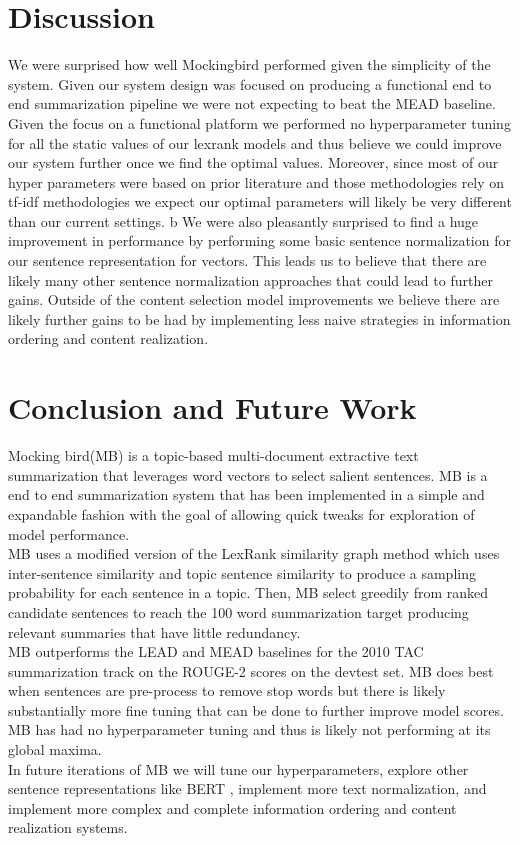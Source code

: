 \documentclass[11pt,a4paper]{article}
\begin{document}
\section{Discussion}
We were surprised how well Mockingbird performed given the simplicity of the system. Given our system design was focused on producing a functional end to end summarization pipeline we were not expecting to beat the MEAD baseline. Given the focus on a functional platform we performed no hyperparameter tuning for all the static values of our lexrank models and thus believe we could improve our system further once we find the optimal values. Moreover, since most of our hyper parameters were based on prior literature and those methodologies rely on tf-idf methodologies we expect our optimal parameters will likely be very different than our current settings.  b We were also pleasantly surprised to find a huge improvement in performance by performing some basic sentence normalization for our sentence representation for vectors. This leads us to believe that there are likely many other sentence normalization approaches that could lead to further gains.  Outside of the content selection model improvements we believe there are likely further gains to be had by implementing less naive strategies in information ordering and content realization. 
\section{Conclusion and Future Work}
Mocking bird(MB) is a topic-based multi-document extractive text summarization that leverages word vectors to select salient sentences. MB is a end to end summarization system that has been implemented in a simple and expandable fashion with the goal of allowing quick tweaks for exploration of model performance. \\
MB uses a modified version of the LexRank similarity graph method which uses inter-sentence similarity and topic sentence similarity to produce a sampling probability for each sentence in a topic. Then, MB select greedily from ranked candidate sentences to reach the 100 word summarization target producing relevant summaries that have little redundancy. \\
MB outperforms the LEAD and MEAD baselines for the 2010 TAC summarization track on the ROUGE-2 scores on the devtest set. MB does best when sentences are pre-process to remove stop words but there is likely substantially more fine tuning that can be done to further improve model scores. MB has had no hyperparameter tuning and thus is likely not performing at its global maxima. \\
In future iterations of MB we will tune our hyperparameters, explore other sentence representations like BERT \cite{Devlin2019BERTPO}, implement more text normalization, and implement more complex and complete information ordering and content realization systems. 


\end{document}
